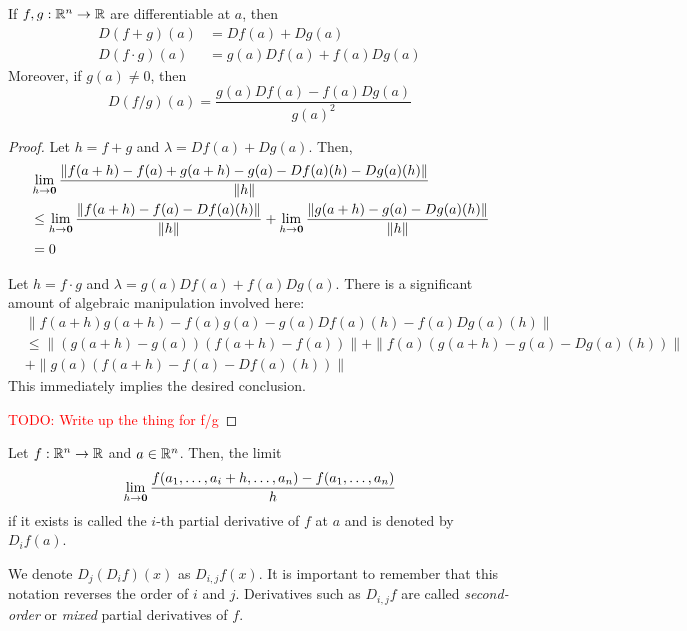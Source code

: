 \begin{proposition}
    If $f,g:\mathbb{R}^n\to\mathbb{R}$ are differentiable at $a$, then 
    \begin{align*}
        D(f + g)(a) &= Df(a) + Dg(a)\\
        D(f\cdot g)(a) &= g(a)Df(a) + f(a)Dg(a)
    \end{align*}
    Moreover, if $g(a)\ne0$, then 
    \begin{equation*}
        D(f/g)(a) = \frac{g(a)Df(a) - f(a)Dg(a)}{g(a)^2}
    \end{equation*}
\end{proposition}
\begin{proof}
    Let $h = f + g$ and $\lambda = Df(a) + Dg(a)$. Then, 
    \begin{align*}
        &\lim_{h\to\mathbf{0}}\frac{\|f(a + h) - f(a) + g(a + h) - g(a) - Df(a)(h) - Dg(a)(h)\|}{\|h\|}\\
        &\le\lim_{h\to\mathbf{0}}\frac{\|f(a+h) - f(a) - Df(a)(h)\|}{\|h\|} + \lim_{h\to\mathbf{0}}\frac{\|g(a + h) - g(a) - Dg(a)(h)\|}{\|h\|}\\
        &= 0
    \end{align*}

    Let $h = f\cdot g$ and $\lambda = g(a)Df(a) + f(a)Dg(a)$. There is a significant amount of algebraic manipulation involved here: 
    \begin{align*}
        &\|f(a+h)g(a+h) - f(a)g(a) - g(a)Df(a)(h) - f(a)Dg(a)(h)\|\\
        &\le\|(g(a+h)-g(a))(f(a+h)-f(a))\| + \|f(a)(g(a+h)-g(a)-Dg(a)(h))\|\\
        &+\|g(a)(f(a+h)-f(a)-Df(a)(h))\|
    \end{align*}
    This immediately implies the desired conclusion.

    \textcolor{red}{TODO: Write up the thing for f/g}
\end{proof}

\begin{definition}
    Let $f:\mathbb{R}^n\to\mathbb{R}$ and $a\in\mathbb{R}^n$. Then, the limit 
    \begin{equation*}
        \lim_{h\to\mathbf{0}}\frac{f(a_1,\ldots,a_i+h,\ldots,a_n) - f(a_1,\ldots,a_n)}{h}
    \end{equation*}
    if it exists is called the $i$-th partial derivative of $f$ at $a$ and is denoted by $D_if(a)$.
\end{definition}

We denote $D_j(D_if)(x)$ as $D_{i,j}f(x)$. It is important to remember that this notation reverses the order of $i$ and $j$. Derivatives such as $D_{i,j}f$ are called \textit{second-order} or \textit{mixed} partial derivatives of $f$.

